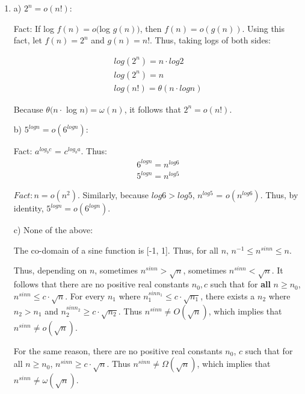 \documentclass[a4paper]{report}
\begin{document}
\begin{enumerate}
    
    \bigskip
    \setcounter{equation}{0}

    \item 

      a) 
      $2^n = o(n!)$:

      Fact: If log $f(n) = o($log $g(n))$, then $f(n) = o(g(n))$. 
      Using this fact, let $f(n) = 2^n$ and $g(n) = n!$. Thus, taking logs of both sides:

      \begin{align}
        log(2^n) = n \cdot log 2 \\
        log(2^n) = n \\
        log(n!) = \theta(n \cdot log n) 
      \end{align}

      Because $\theta(n \cdot$ log $n) = \omega(n)$, it follows that $2^n = o(n!)$.

      \bigskip
      b) $5^{log n} = o(6^{log n})$:
      
      Fact: $a^{log_{b} c}$ = $c ^ {log_{b} a} $. Thus:
      \begin{align}
        6^{log n} = n^{log 6} \\
        5^{log n} = n^{log 5} 
      \end{align}

      $Fact: n = o(n^2)$. Similarly, because $log 6 > log 5$, $n^{log 5}$ = $o(n^{log 6})$. 
      Thus, by identity, $5^{log n} = o(6^{log n})$.

      \bigskip
      c) None of the above:
      
      The co-domain of a sine function is [-1, 1]. Thus, for all $n$, $n^{-1} \leq n^{sin n} \leq n$.

      Thus, depending on $n$, sometimes $n^{sin n} > \sqrt{n}$, sometimes $n^{sin n} < \sqrt{n}$.
      It follows that there are no positive real constants $n_{0}, c$ such that for {\bf all} $n \geq n_{0}$,  $n^{sin n} \leq c \cdot \sqrt{n}$.
      For every $n_{1}$ where $n_{1}^{sin n_{1}} \leq c \cdot \sqrt{n_{1}}$, there exists a $n_{2}$ where $n_{2} > n_{1}$ and $n_{2}^{sin n_{2}} \geq c \cdot \sqrt{n_{2}}$.
      Thus $n^{sin n} \neq O(\sqrt{n})$, which implies that $n^{sin n} \neq o(\sqrt{n})$.

      For the same reason, there are no positive real constants $n_{0}$, $c$ such that for all $n \geq n_{0}$, 
      $n^{sin n} \geq c \cdot \sqrt{n}$. 
      Thus $n^{sin n} \neq \Omega(\sqrt{n})$, which implies that $n^{sin n} \neq \omega(\sqrt{n})$.


\end{enumerate}
\end{document}
